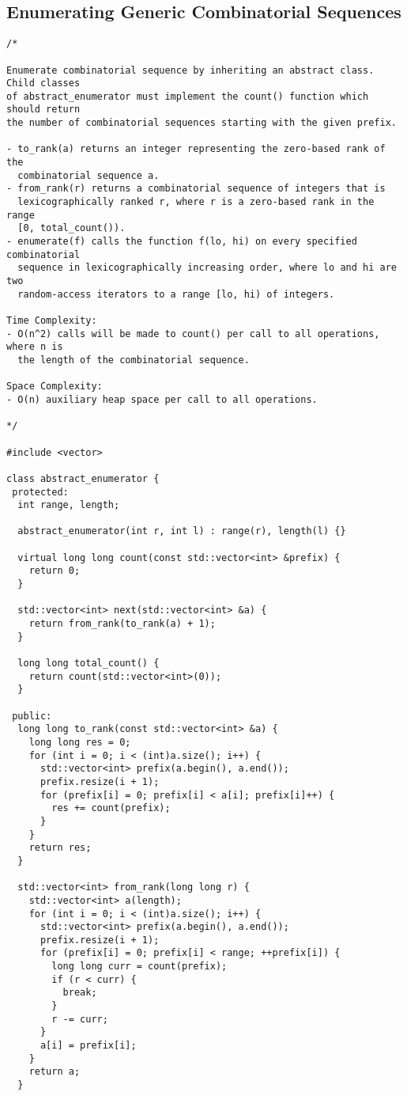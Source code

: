 \subsection{Enumerating Generic Combinatorial Sequences}
\begin{lstlisting}
/*

Enumerate combinatorial sequence by inheriting an abstract class. Child classes
of abstract_enumerator must implement the count() function which should return
the number of combinatorial sequences starting with the given prefix.

- to_rank(a) returns an integer representing the zero-based rank of the
  combinatorial sequence a.
- from_rank(r) returns a combinatorial sequence of integers that is
  lexicographically ranked r, where r is a zero-based rank in the range
  [0, total_count()).
- enumerate(f) calls the function f(lo, hi) on every specified combinatorial
  sequence in lexicographically increasing order, where lo and hi are two
  random-access iterators to a range [lo, hi) of integers.

Time Complexity:
- O(n^2) calls will be made to count() per call to all operations, where n is
  the length of the combinatorial sequence.

Space Complexity:
- O(n) auxiliary heap space per call to all operations.

*/

#include <vector>

class abstract_enumerator {
 protected:
  int range, length;

  abstract_enumerator(int r, int l) : range(r), length(l) {}

  virtual long long count(const std::vector<int> &prefix) {
    return 0;
  }

  std::vector<int> next(std::vector<int> &a) {
    return from_rank(to_rank(a) + 1);
  }

  long long total_count() {
    return count(std::vector<int>(0));
  }

 public:
  long long to_rank(const std::vector<int> &a) {
    long long res = 0;
    for (int i = 0; i < (int)a.size(); i++) {
      std::vector<int> prefix(a.begin(), a.end());
      prefix.resize(i + 1);
      for (prefix[i] = 0; prefix[i] < a[i]; prefix[i]++) {
        res += count(prefix);
      }
    }
    return res;
  }

  std::vector<int> from_rank(long long r) {
    std::vector<int> a(length);
    for (int i = 0; i < (int)a.size(); i++) {
      std::vector<int> prefix(a.begin(), a.end());
      prefix.resize(i + 1);
      for (prefix[i] = 0; prefix[i] < range; ++prefix[i]) {
        long long curr = count(prefix);
        if (r < curr) {
          break;
        }
        r -= curr;
      }
      a[i] = prefix[i];
    }
    return a;
  }


\end{lstlisting}
